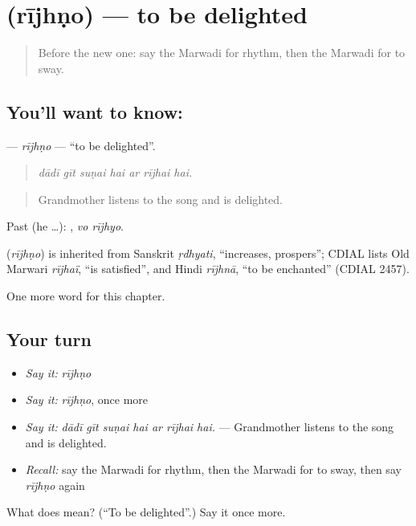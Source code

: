 \section[\texorpdfstring{\mw{रीझणो} (rījhṇo)}{रीझणो (rījhṇo)}]{ (rījhṇo) — to be delighted}

\label{lesson:MW-C277-rijhno}



\begin{quote}
Before the new one: say the Marwadi for rhythm, then the Marwadi for to sway.
\end{quote}

\subsection*{You'll want to know: }
\textbf{} — \emph{rījhṇo} — \textquotedblleft{}to be delighted\textquotedblright{}.

\begin{quote}
      
\end{quote}

\begin{quote}
\emph{dādī gīt suṇai hai ar rījhai hai.}
\end{quote}

\begin{quote}
Grandmother listens to the song and is delighted.
\end{quote}

Past (he …):  , \emph{vo rījhyo}.

\begin{cousinweb}
\textbf{} (\emph{rījhṇo}) is inherited from Sanskrit \emph{ṛdhyati}, \textquotedblleft{}increases, prospers\textquotedblright{}; CDIAL lists Old Marwari \emph{rījhaï}, \textquotedblleft{}is satisfied\textquotedblright{}, and Hindi \emph{rījhnā}, \textquotedblleft{}to be enchanted\textquotedblright{} (CDIAL 2457).
\end{cousinweb}

\begin{grammarlens}[title={What you've built}]
One more word for this chapter.
\end{grammarlens}

\subsection*{Your turn}
\begin{itemize}
\raggedright
  \item \emph{Say it:} \emph{rījhṇo}
  \item \emph{Say it:} \emph{rījhṇo}, once more
  \item \emph{Say it:} \emph{dādī gīt suṇai hai ar rījhai hai.} — Grandmother listens to the song and is delighted.
  \item \emph{Recall:} say the Marwadi for rhythm, then the Marwadi for to sway, then say \emph{rījhṇo} again
\end{itemize}

\begin{tcolorbox}[breakable,colback=teal!4,colframe=teal!35!black,title={Before you move on}]
What does  mean? (\textquotedblleft{}To be delighted\textquotedblright{}.) Say it once more.
\end{tcolorbox}
